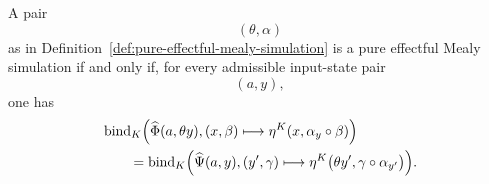 \begin{proposition}
\label{prop:pure-effectful-simulation-law}
    A pair
    \[
        (\theta,\alpha)
    \]
    as in Definition~\ref{def:pure-effectful-mealy-simulation} is a pure
    effectful Mealy simulation if and only if, for every admissible
    input-state pair
    \[
        (a,y),
    \]
    one has
    \begin{equation}
    \begin{aligned}
        &
        \operatorname{bind}_{K}
        \Bigl(
            \widehat\Phi(a,\theta y),
            (x,\beta)
            \longmapsto
            \eta^K
            (x,\alpha_y\circ\beta)
        \Bigr)
        \\
        &\qquad=
        \operatorname{bind}_{K}
        \Bigl(
            \widehat\Psi(a,y),
            (y',\gamma)
            \longmapsto
            \eta^K
            \bigl(
                \theta y',
                \gamma\circ\alpha_{y'}
            \bigr)
        \Bigr).
    \end{aligned}
    \label{eq:pure-effectful-simulation-component}
    \end{equation}
\end{proposition}
